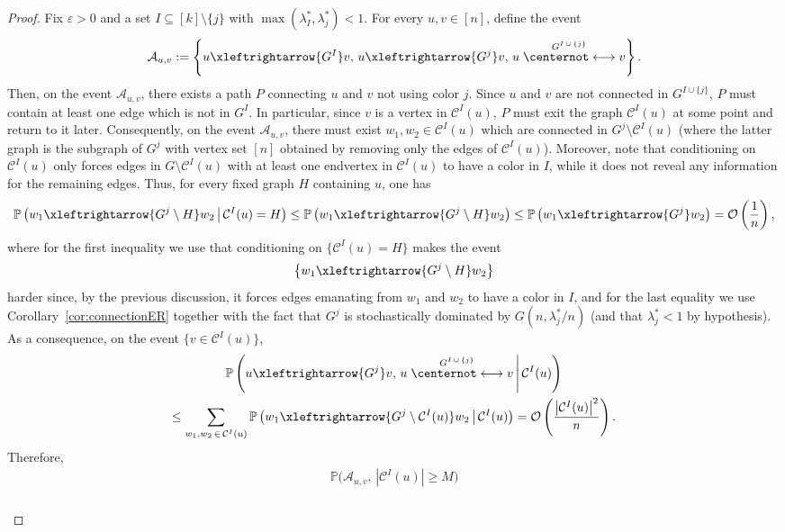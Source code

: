 \documentclass[AHL,Unicode,longabstracts,published]{cedram}
\renewcommand{\Pr}{\mathbb{P}}
\newcommand{\cO}{\mathcal{O}}
\newcommand{\cC}{\mathcal{C}}
\newcommand{\cA}{\mathcal{A}}
\begin{document}
\begin{proof}
Fix $\varepsilon>0$ and a set $I\subseteq [k]\setminus \{j\}$ with $\max(\lambda_I^*,\lambda_j^*)<1$. For every $u,v\in [n]$, define the event
\[
\cA_{u,v}:=\left\{u\xleftrightarrow{G^I}v, \, u\xleftrightarrow{G^j}v, \, u\stackrel{G^{I\,\cup\,\{j\}}}{\centernot\longleftrightarrow} v\right\}.
\]
Then, on the event $\cA_{u,v}$, there exists a path $P$ connecting $u$ and $v$ not using color $j$. Since $u$ and $v$ are not connected in $G^{I\cup \{j\}}$, $P$ must contain at least one edge which is not in $G^I$. In particular, since $v$ is a vertex in $\cC^I(u)$, $P$ must exit the graph $\cC^I(u)$ at some point and return to it later. Consequently, on the event $\cA_{u,v}$, there must exist $w_1,w_2 \in \cC^I(u)$ which are connected in $G^j\setminus \cC^I(u)$ (where the latter graph is the subgraph of $G^j$ with vertex set $[n]$ obtained by removing only the edges of $\cC^I(u)$). Moreover, note that conditioning on $\cC^I(u)$ only forces edges in $G\setminus \cC^I(u)$ with at least one endvertex in $\cC^I(u)$ to have a color in $I$, while it does not reveal any information for the remaining edges. Thus, for every fixed graph $H$ containing $u$, one has
\[
\Pr\left(w_1\xleftrightarrow{G^j\setminus H}w_2
\,\middle|\, \cC^I(u)=H\right) \le \Pr\left(w_1\xleftrightarrow{G^j\setminus H}w_2\right) \le \Pr\left(w_1\xleftrightarrow{G^j}w_2\right) = \cO\left(\frac 1n\right),
\]
where for the first inequality we use that conditioning on $\{\cC^I(u)=H\}$ makes the event
\[
\left\{w_1\xleftrightarrow{G^j\setminus H}w_2\right\}
\]
harder since, by the previous discussion, it forces edges emanating from $w_1$ and $w_2$ to have a color in $I$, and for the last equality we use Corollary~\ref{cor:connectionER} together with the fact that $G^j$ is stochastically dominated by $G(n,\lambda_j^*/n)$ (and that $\lambda_j^*<1$ by hypothesis). As a consequence, on the event $\{v\in \cC^I(u)\}$,
\begin{multline*}
\Pr\left(u\xleftrightarrow{G^j}v, \, u\stackrel{G^{I\,\cup\,\{j\}}}{\centernot\longleftrightarrow} v
\,\middle|\, \cC^I(u)\right) \\
\le \sum_{w_1,w_2\,\in\,\cC^I(u)}
\Pr\left(w_1\xleftrightarrow{G^j\setminus \cC^I(u)}w_2\,
\middle|\, \cC^I(u)\right)
= \cO\left(\frac{\left|\cC^I(u)\right|^2}{n}\right).
\end{multline*}
Therefore,
\begin{multline}\label{eq:part 1}
\Pr\big(\cA_{u,v}, \, \left|\cC^I(u)\right|\ge M\big)\\
\begin{aligned}

\end{aligned}
\end{multline}
\end{proof}
\end{document}
